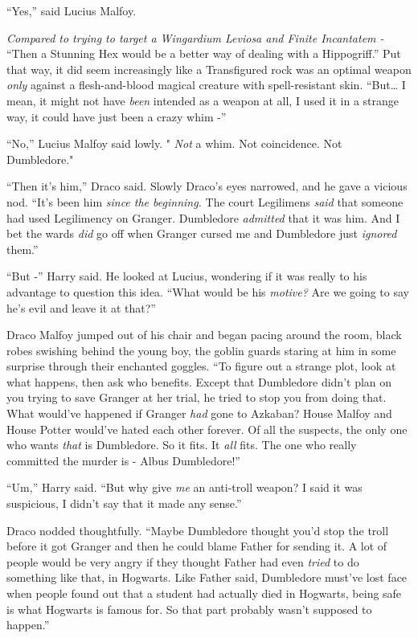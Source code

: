 ``Yes,'' said Lucius Malfoy.

\emph{Compared to trying to target a Wingardium Leviosa and Finite
Incantatem -} ``Then a Stunning Hex would be a better way of dealing
with a Hippogriff.'' Put that way, it did seem increasingly like a
Transfigured rock was an optimal weapon \emph{only} against a
flesh-and-blood magical creature with spell-resistant skin.
``But\ldots{} I mean, it might not have \emph{been} intended as a weapon
at all, I used it in a strange way, it could have just been a crazy whim
-''

``No,'' Lucius Malfoy said lowly. " \emph{Not} a whim. Not coincidence.
Not Dumbledore."

``Then it's him,'' Draco said. Slowly Draco's eyes narrowed, and he gave
a vicious nod. ``It's been him \emph{since the beginning.} The court
Legilimens \emph{said} that someone had used Legilimency on Granger.
Dumbledore \emph{admitted} that it was him. And I bet the wards
\emph{did} go off when Granger cursed me and Dumbledore just
\emph{ignored} them.''

``But -'' Harry said. He looked at Lucius, wondering if it was really to
his advantage to question this idea. ``What would be his \emph{motive?}
Are we going to say he's evil and leave it at that?''

Draco Malfoy jumped out of his chair and began pacing around the room,
black robes swishing behind the young boy, the goblin guards staring at
him in some surprise through their enchanted goggles. ``To figure out a
strange plot, look at what happens, then ask who benefits. Except that
Dumbledore didn't plan on you trying to save Granger at her trial, he
tried to stop you from doing that. What would've happened if Granger
\emph{had} gone to Azkaban? House Malfoy and House Potter would've hated
each other forever. Of all the suspects, the only one who wants
\emph{that} is Dumbledore. So it fits. It \emph{all} fits. The one who
really committed the murder is - Albus Dumbledore!''

``Um,'' Harry said. ``But why give \emph{me} an anti-troll weapon? I
said it was suspicious, I didn't say that it made any sense.''

Draco nodded thoughtfully. ``Maybe Dumbledore thought you'd stop the
troll before it got Granger and then he could blame Father for sending
it. A lot of people would be very angry if they thought Father had even
\emph{tried} to do something like that, in Hogwarts. Like Father said,
Dumbledore must've lost face when people found out that a student had
actually died in Hogwarts, being safe is what Hogwarts is famous for. So
that part probably wasn't supposed to happen.''

